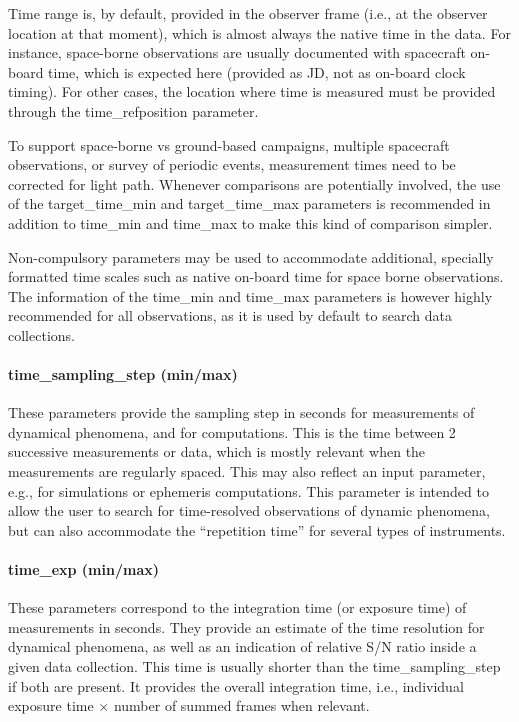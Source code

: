 \documentclass[11pt,a4paper]{ivoa}
\begin{document}
Time range is, by default, provided in the observer frame (i.e., at the
observer location at that moment), which is almost always the native time
in the data. For instance, space-borne observations are usually documented
with spacecraft on-board time, which is expected here (provided as JD,
not as on-board clock timing). For other cases, the location where time
is measured must be provided through the time\_refposition parameter.

To support space-borne vs ground-based campaigns, multiple spacecraft
observations, or survey of periodic events, measurement times need to be
corrected for light path. Whenever comparisons are potentially involved,
the use of the target\_time\_min and target\_time\_max parameters is
recommended in addition to time\_min and time\_max to make this kind of
comparison simpler.

Non-compulsory parameters may be used to accommodate additional,
specially formatted time scales such as native on-board time for space
borne observations. The information of the time\_min and time\_max
parameters is however highly recommended for all observations,
as it is used by default to search data collections.

\paragraph{time\_sampling\_step (min/max)}

These parameters provide the sampling step in seconds for measurements
of dynamical phenomena, and for computations. This is the time between
2 successive measurements or data, which is mostly relevant when the
measurements are regularly spaced. This may also reflect an input
parameter, e.g., for simulations or ephemeris computations. This
parameter is intended to allow the user to search for time-resolved
observations of dynamic phenomena, but can also accommodate the
``repetition time'' for several types of instruments.

\paragraph{time\_exp (min/max)}

These parameters correspond to the integration time (or exposure
time) of measurements in seconds. They provide an estimate of the time
resolution for dynamical phenomena, as well as an indication of relative
S/N ratio inside a given data collection. This time is usually shorter than
the time\_sampling\_step if both are present. It provides the overall
integration time, i.e., individual exposure time $\times$ number of summed
frames when relevant.
\end{document}
